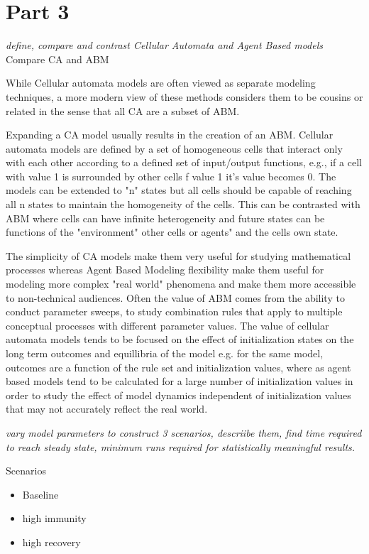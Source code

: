 \documentclass[11pt]{article} %
\begin{document}
\section{Part 3}

\textit{define, compare and contrast Cellular Automata and Agent Based models}
Compare CA and ABM

While Cellular automata models are often viewed as separate modeling techniques, a more modern view of these methods considers them to be cousins or related in the sense that all CA are a subset of ABM. 

Expanding a CA model usually results in the creation of an ABM.  Cellular automata models are defined by a set of homogeneous cells that interact only with each other according to a defined set of input/output functions, e.g., if a cell with value 1 is surrounded by other cells f value 1 it's value becomes 0. The models can be extended to "n" states but all cells should be capable of reaching all n states to maintain the homogeneity of the cells. This can be contrasted with ABM where cells can have infinite heterogeneity and future states can be functions of the "environment" other cells or agents" and the cells own state. 

The simplicity of CA models make them very useful for studying mathematical processes whereas Agent Based Modeling flexibility make them useful for modeling more complex "real world" phenomena and make them more accessible to non-technical audiences. Often the value of ABM comes from the ability to conduct parameter sweeps, to study combination rules that apply to multiple conceptual processes with different parameter values. The value of cellular automata models tends to be focused on the effect of initialization states on the long term outcomes and equillibria of the model e.g. for the same model, outcomes are a function of the rule set and initialization values, where as agent based models tend to be calculated for a large number of initialization values in order to study the effect of model dynamics independent of initialization values that may not accurately reflect the real world. 

\textit{ vary model parameters to construct 3 scenarios, descriibe them, find time required to reach steady state, minimum runs required for statistically meaningful results. }

Scenarios
\begin{itemize}
\item Baseline 
\item high immunity
\item high recovery
\end{itemize}
\end{document}
